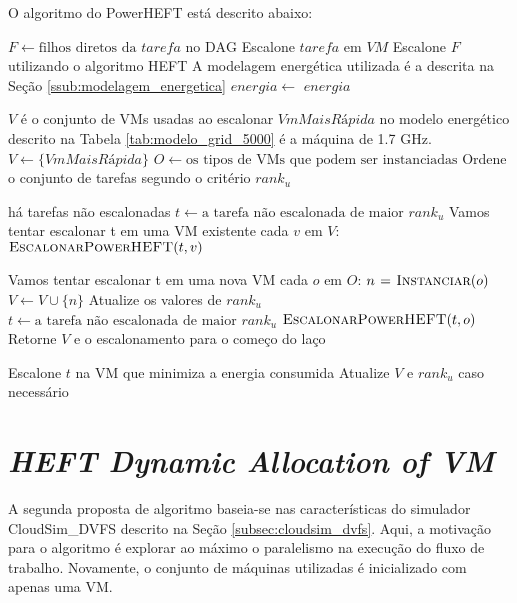 O algoritmo do PowerHEFT está descrito abaixo:

\begin{codebox}
	\li $F \gets \text{filhos diretos da } tarefa \text{ no DAG}$
    \li Escalone $tarefa$ em $VM$
	\li Escalone $F$ utilizando o algoritmo \textsc{HEFT}
	\zi
	\li \Comment A modelagem energética utilizada é a descrita na Seção \ref{ssub:modelagem_energetica}
	\li $energia \gets$ 
	\li \Return $energia$
\end{codebox}


\begin{codebox}
	\li \Comment $V$ é o conjunto de VMs usadas ao escalonar
	\li \Comment $VmMaisRápida$ no modelo energético descrito na
	 Tabela \ref{tab:modelo_grid_5000} é a máquina de 1.7 GHz.
	\li $V \gets \{VmMaisRápida\}$
	\li $O \gets \text{os tipos de VMs que podem ser instanciadas}$
	\li Ordene o conjunto de tarefas segundo o critério $rank_u$
   
	\li \While há tarefas não escalonadas
		\li \Do $t \gets \text{a tarefa não escalonada de maior } rank_u$
		\zi
	    \li \Comment Vamos tentar escalonar t em uma VM existente
	    \li \For cada $v$ em $V$:
		    \li \Do	$\textnormal{\scshape EscalonarPowerHEFT}(t, v)$
	    \End
	    
	    \zi
	    \li \Comment Vamos tentar escalonar t em uma nova VM
	    \li \For cada $o$ em $O$:
	    	\li \Do $n \mathrel{\hspace{1pt}=\hspace{1pt}} \textnormal{\scshape Instanciar}(o)$
		    \li $V \gets V \cup \{n\}$
		    \li Atualize os valores de $rank_u$
		    \li $t \gets \text{a tarefa não escalonada de maior } rank_u$
		    \li $\textnormal{\scshape EscalonarPowerHEFT}(t, o)$
		    \li Retorne $V$ e o escalonamento para o começo do laço
	    \End
	    
	    \li Escalone $t$ na VM que minimiza a energia consumida
	    \li Atualize $V$ e $rank_u$ caso necessário
	\End
\End
\end{codebox}


\section{\emph{HEFT Dynamic Allocation of VM}} %
\label{sec:heft_davm}

A segunda proposta de algoritmo baseia-se nas características do simulador
CloudSim\_DVFS descrito na Seção \ref{subsec:cloudsim_dvfs}. Aqui, a motivação para
o algoritmo é explorar ao máximo o paralelismo na execução do fluxo de trabalho.
Novamente, o conjunto de máquinas utilizadas é inicializado com apenas uma VM.


